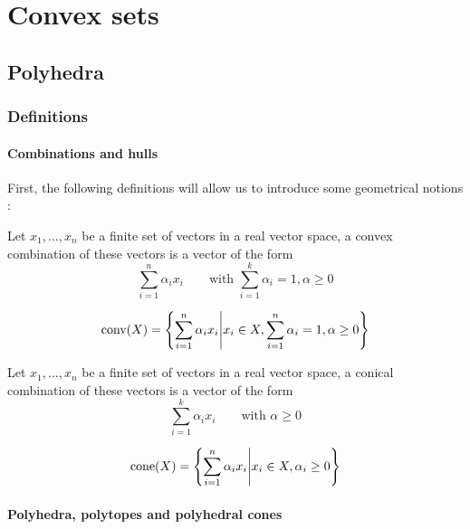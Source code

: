 \chapter{Convex sets}

\section{Polyhedra}

\subsection{Definitions}

\subsubsection{Combinations and hulls}

First, the following definitions will allow us to introduce some geometrical notions :

\begin{definition}
    Let $x_1,...,x_n$ be a finite set of vectors in a real vector space, a convex combination of these vectors is a vector of the form 
    \[
        \sum_{i=1}^n\alpha_ix_i\qquad\textrm{with } \sum_{i=1}^k\alpha_i = 1, \alpha\ge 0
    \]
\end{definition}

\begin{definition}
    \[
        \textrm{conv}(X) = \left\{ \sum_{i=1}^n\alpha_ix_i \middle| x_i\in X, \sum_{i=1}^n\alpha_i = 1, \alpha\ge 0 \right\}
    \]
\end{definition}

\begin{definition}
    Let $x_1,...,x_n$ be a finite set of vectors in a real vector space, a conical combination of these vectors is a vector of the form 
    \[
        \sum_{i=1}^k \alpha_ix_i \qquad\textrm{with } \alpha\ge 0
    \]
\end{definition}

\begin{definition}
\[
    \textrm{cone}(X) = \left\{ \sum_{i=1}^n \alpha_ix_i \middle| x_i\in X, \alpha_i \ge 0 \right \}
\]
\end{definition}

\subsubsection{Polyhedra, polytopes and polyhedral cones}

